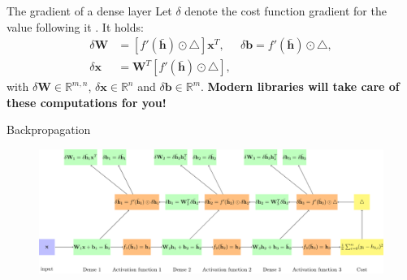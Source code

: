 \documentclass{beamer}
\begin{document}
		\begin{frame}{The gradient of a dense layer}
      Let $\delta$ denote the cost function gradient for the value following it \cite{greff2016lstm}. It holds:
      \begin{align}
        \delta \mathbf{W} &= [f'(\bar{\mathbf{h}}) \odot \triangle]\mathbf{x}^T, &  \delta \mathbf{b} = f'(\bar{\mathbf{h}}) \odot \triangle, \\
        \delta \mathbf{x} &= \mathbf{W}^T [f'(\bar{\mathbf{h}}) \odot \triangle],
      \end{align}
      with $\delta \mathbf{W} \in \mathbb{R}^{m,n}$, $\delta \mathbf{x} \in \mathbb{R}^{n}$ and $\delta \mathbf{b} \in \mathbb{R}^{m}$.
      \textbf{Modern libraries will take care of these computations for you!} \\
    \end{frame}
		\begin{frame}{Backpropagation}
      \begin{figure}
        \includegraphics[width=\linewidth]{./figures/backprop.pdf} 
      \end{figure}
    \end{frame}
		
\end{document}

